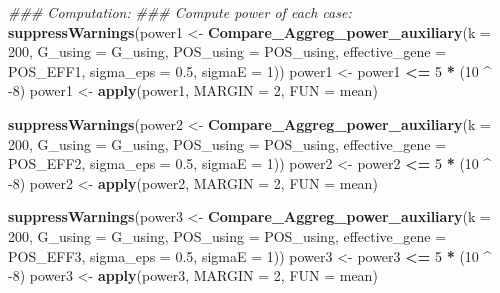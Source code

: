 \documentclass[
]{article}
\newenvironment{Shaded}{\begin{snugshade}}{\end{snugshade}}
\newcommand{\CommentTok}[1]{\textcolor[rgb]{0.56,0.35,0.01}{\textit{#1}}}
\newcommand{\DataTypeTok}[1]{\textcolor[rgb]{0.13,0.29,0.53}{#1}}
\newcommand{\DecValTok}[1]{\textcolor[rgb]{0.00,0.00,0.81}{#1}}
\newcommand{\FloatTok}[1]{\textcolor[rgb]{0.00,0.00,0.81}{#1}}
\newcommand{\KeywordTok}[1]{\textcolor[rgb]{0.13,0.29,0.53}{\textbf{#1}}}
\newcommand{\NormalTok}[1]{#1}
\newcommand{\OperatorTok}[1]{\textcolor[rgb]{0.81,0.36,0.00}{\textbf{#1}}}
\newcommand{\StringTok}[1]{\textcolor[rgb]{0.31,0.60,0.02}{#1}}
\begin{document}
\begin{Shaded}
\begin{Highlighting}[]
\CommentTok{### Computation:}
\CommentTok{### Compute power of each case:}
\KeywordTok{suppressWarnings}\NormalTok{(power1 <-}\StringTok{ }\KeywordTok{Compare_Aggreg_power_auxiliary}\NormalTok{(}\DataTypeTok{k =} \DecValTok{200}\NormalTok{, }\DataTypeTok{G_using =}\NormalTok{ G_using, }\DataTypeTok{POS_using =}\NormalTok{ POS_using, }\DataTypeTok{effective_gene =}\NormalTok{ POS_EFF1, }\DataTypeTok{sigma_eps =} \FloatTok{0.5}\NormalTok{, }\DataTypeTok{sigmaE =} \DecValTok{1}\NormalTok{))}
\NormalTok{power1 <-}\StringTok{ }\NormalTok{power1 }\OperatorTok{<=}\StringTok{ }\DecValTok{5} \OperatorTok{*}\StringTok{ }\NormalTok{(}\DecValTok{10} \OperatorTok{^}\StringTok{ }\DecValTok{-8}\NormalTok{)}
\NormalTok{power1 <-}\StringTok{ }\KeywordTok{apply}\NormalTok{(power1, }\DataTypeTok{MARGIN =} \DecValTok{2}\NormalTok{, }\DataTypeTok{FUN =}\NormalTok{ mean)}

\KeywordTok{suppressWarnings}\NormalTok{(power2 <-}\StringTok{ }\KeywordTok{Compare_Aggreg_power_auxiliary}\NormalTok{(}\DataTypeTok{k =} \DecValTok{200}\NormalTok{, }\DataTypeTok{G_using =}\NormalTok{ G_using, }\DataTypeTok{POS_using =}\NormalTok{ POS_using, }\DataTypeTok{effective_gene =}\NormalTok{ POS_EFF2, }\DataTypeTok{sigma_eps =} \FloatTok{0.5}\NormalTok{, }\DataTypeTok{sigmaE =} \DecValTok{1}\NormalTok{))}
\NormalTok{power2 <-}\StringTok{ }\NormalTok{power2 }\OperatorTok{<=}\StringTok{ }\DecValTok{5} \OperatorTok{*}\StringTok{ }\NormalTok{(}\DecValTok{10} \OperatorTok{^}\StringTok{ }\DecValTok{-8}\NormalTok{)}
\NormalTok{power2 <-}\StringTok{ }\KeywordTok{apply}\NormalTok{(power2, }\DataTypeTok{MARGIN =} \DecValTok{2}\NormalTok{, }\DataTypeTok{FUN =}\NormalTok{ mean)}

\KeywordTok{suppressWarnings}\NormalTok{(power3 <-}\StringTok{ }\KeywordTok{Compare_Aggreg_power_auxiliary}\NormalTok{(}\DataTypeTok{k =} \DecValTok{200}\NormalTok{, }\DataTypeTok{G_using =}\NormalTok{ G_using, }\DataTypeTok{POS_using =}\NormalTok{ POS_using, }\DataTypeTok{effective_gene =}\NormalTok{ POS_EFF3, }\DataTypeTok{sigma_eps =} \FloatTok{0.5}\NormalTok{, }\DataTypeTok{sigmaE =} \DecValTok{1}\NormalTok{))}
\NormalTok{power3 <-}\StringTok{ }\NormalTok{power3 }\OperatorTok{<=}\StringTok{ }\DecValTok{5} \OperatorTok{*}\StringTok{ }\NormalTok{(}\DecValTok{10} \OperatorTok{^}\StringTok{ }\DecValTok{-8}\NormalTok{)}
\NormalTok{power3 <-}\StringTok{ }\KeywordTok{apply}\NormalTok{(power3, }\DataTypeTok{MARGIN =} \DecValTok{2}\NormalTok{, }\DataTypeTok{FUN =}\NormalTok{ mean)}


\end{Highlighting}
\end{Shaded}
\end{document}

